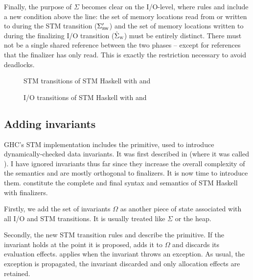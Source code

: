 Finally, the purpose of $\Sigma$ becomes clear on the I/O-level, where rules  and  include a new condition above the line:
the set of memory locations read from or written to during the STM transition ($\Sigma'_\textsc{rw}$) and the set of memory locations written to during the finalizing I/O transition ($\hat{\Sigma}_\textsc{w}$) must be entirely distinct.
There must not be a single shared reference between the two phases -- except for references that the finalizer has only read.
This is exactly the restriction necessary to avoid deadlocks.

\begin{figure}[p]

\caption{STM transitions of STM Haskell with  and }
\label{fig:step2-stm}
\end{figure}

\begin{figure}[p]

\caption{I/O transitions of STM Haskell with  and }
\label{fig:step2-io}
\end{figure}

\clearpage


\subsection{Adding invariants}

GHC's STM implementation includes the  primitive, used to introduce dynamically-checked data invariants.
It was first described in \textcite{harris-peytonjones-2006} (where it was called ).
I have ignored invariants thus far since they increase the overall complexity of the semantics and are mostly orthogonal to finalizers.
It is now time to introduce them.
 constitute the complete and final syntax and semantics of STM Haskell with finalizers.

Firstly, we add the set of invariants $\Omega$ as another piece of state associated with all I/O and STM transitions.
It is usually treated like $\Sigma$ or the heap.

Secondly, the new STM transition rules  and  describe the  primitive.
If the invariant holds at the point it is proposed,  adds it to $\Omega$ and discards its evaluation effects.
 applies when the invariant throws an exception.
As usual, the exception is propagated, the invariant discarded and only allocation effects are retained.

